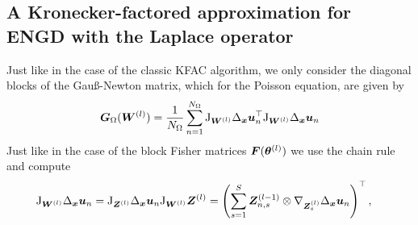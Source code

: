 
\subsection{A Kronecker-factored approximation for ENGD with the Laplace operator}

Just like in the case of the classic KFAC algorithm, we only consider the diagonal blocks of the Gauß-Newton matrix, which for the Poisson equation, are given by
\begin{align}
    {\bm{G}}_\Omega({\bm{W}}^{(l)}) = \frac1{{N_\Omega}} \sum_{n=1}^{N_\Omega} \mathrm{J}_{{\bm{W}}^{(l)}} \Delta_{\bm{x}} {\bm{u}}_n^\top \mathrm{J}_{{\bm{W}}^{(l)}} \Delta_{\bm{x}} {\bm{u}}_n
\end{align}
Just like in the case of the block Fisher matrices ${\bm{F}}({\bm{\theta}}^{(l)})$ we use the chain rule and compute
\begin{align*}
    \jac_{\mW^{(l)}} \Delta_\vx \vu_n & = \jac_{\mZ^{(l)}}\Delta_\vx \vu_n \jac_{\mW^{(l)}} \mZ^{(l)} %
    = \left(\sum_{s=1}^S \mZ^{(l-1)}_{n,s} \otimes \nabla_{\mZ^{(l)}_s} \Delta_{\vx}\vu_n\right)^\top,
\end{align*}
